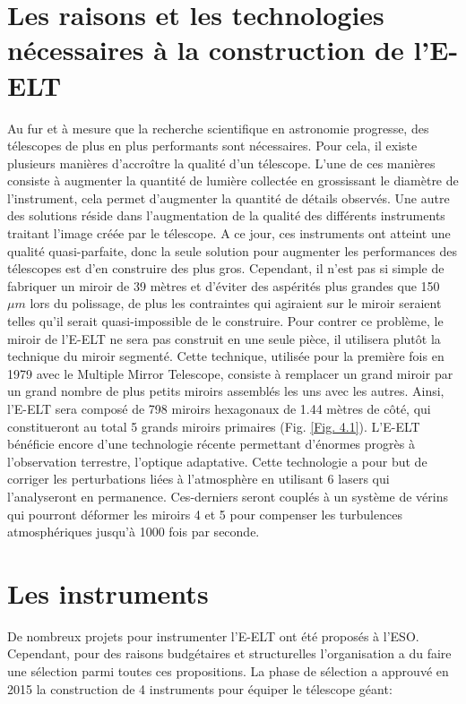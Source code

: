 \section{Les raisons et les technologies nécessaires à la construction de l'E-ELT}\label{4.1}

Au fur et à mesure que la recherche scientifique en astronomie progresse, des télescopes de plus en plus performants sont nécessaires. Pour cela, il existe plusieurs manières d'accroître la qualité d'un télescope. L'une de ces manières consiste à augmenter la quantité de lumière collectée en grossissant le diamètre de l'instrument, cela permet d'augmenter la quantité de détails observés. Une autre des solutions réside dans l'augmentation de la qualité des différents instruments traitant l'image créée par le télescope. A ce jour, ces instruments ont atteint une qualité quasi-parfaite, donc la seule solution pour augmenter les performances des télescopes est d'en construire des plus gros. Cependant, il n'est pas si simple de fabriquer un miroir de 39 mètres et d'éviter des aspérités plus grandes que 150 $\mu m$ lors du polissage, de plus les contraintes qui agiraient sur le miroir seraient telles qu'il serait quasi-impossible de le construire. Pour contrer ce problème, le miroir de l'E-ELT ne sera pas construit en une seule pièce, il utilisera plutôt la technique du miroir segmenté. Cette technique, utilisée pour la première fois en 1979 avec le Multiple Mirror Telescope, consiste à remplacer un grand miroir par un grand nombre de plus petits miroirs assemblés les uns avec les autres. Ainsi, l'E-ELT sera composé de 798 miroirs hexagonaux de 1.44 mètres de côté, qui constitueront au total 5 grands miroirs primaires (Fig. \ref{Fig. 4.1}). L'E-ELT bénéficie encore d'une technologie récente permettant d'énormes progrès à l'observation terrestre, l'optique adaptative. Cette technologie a pour but de corriger les perturbations liées à l'atmosphère en utilisant 6 lasers qui l'analyseront en permanence. Ces-derniers seront couplés à un système de vérins qui pourront déformer les miroirs 4 et 5 pour compenser les turbulences atmosphériques jusqu'à 1000 fois par seconde.

\section{Les instruments}\label{4.2}

De nombreux projets pour instrumenter l'E-ELT ont été proposés à l'ESO. Cependant, pour des raisons budgétaires et structurelles l'organisation a du faire une sélection parmi toutes ces propositions. La phase de sélection a approuvé en 2015 la construction de 4 instruments pour équiper le télescope géant:

